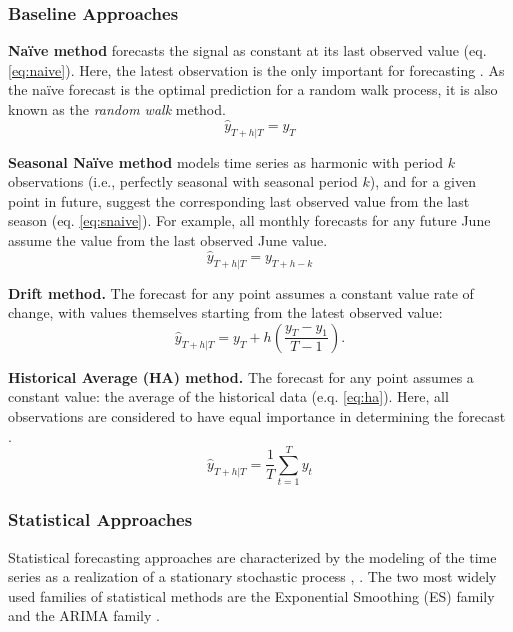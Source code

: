 \subsubsection{Baseline Approaches}\label{subsubsec:baseline_methods}

\noindent
\textbf{Naïve method} forecasts the signal as constant at its last observed value (eq. \ref{eq:naive}).
Here, the latest observation is the only important for forecasting \cite{hyndman2018principles}.
As the naïve forecast is the optimal prediction for a random walk process, it is also known as the \textit{random walk} method.
\begin{equation}\label{eq:naive}
    \hat{y}_{T+h|T} = y_T
\end{equation}

\noindent
\textbf{Seasonal Naïve method} models time series as harmonic with period $k$ observations (i.e., perfectly seasonal with seasonal period $k$), and for a given point  in future, suggest the corresponding last observed value from the last season (eq. \ref{eq:snaive}).
For example, all monthly forecasts for any future June assume the value from the last observed June value.
\begin{equation}\label{eq:snaive}
    \hat{y}_{T+h|T} = y_{T+h-k}
\end{equation}

\noindent
\textbf{Drift method.} The forecast for any point assumes a constant value rate of change, with values themselves starting from the latest observed value:
\begin{equation}\label{eq:drift}
    \hat{y}_{T+h|T} = y_{T} + h\left(\frac{y_T-y_1}{T-1} \right).
\end{equation}


\noindent
\textbf{Historical Average (HA) method.} The forecast for any point assumes a constant value: the average of the historical data (e.q. \ref{eq:ha}).
Here, all observations are considered to have equal importance in determining the forecast \cite{hyndman2018principles}.
\begin{equation}\label{eq:ha}
\hat{y}_{T+h|T} = \frac{1}{T}\sum_{t=1}^Ty_t
\end{equation}

\subsubsection{Statistical Approaches}\label{subsubsec:statistical_methods}

Statistical forecasting approaches are characterized by the modeling of the time series as a realization of a stationary stochastic process \cite{brockwell1990methods}, \cite{bontempi2013strategies}.
The two most widely used families of statistical methods are the Exponential Smoothing (ES) family and the ARIMA family \cite{hyndman2018principles}.

